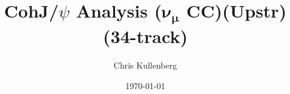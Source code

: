 \title{CohJ/$\psi$ Analysis ($\boldsymbol{\nu_\mu}$ \textbf{CC})(\textbf{Upstr})(\textbf{34-track})}
\author{Chris Kullenberg}
\date{\today}
